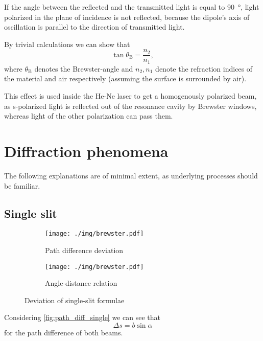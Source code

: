 If the angle between the reflected and the transmitted light is equal to \SI{90}{\degree}, light polarized in the plane of incidence is not reflected, because the dipole's axis of oscillation is parallel to the direction of transmitted light.

By trivial calculations we can show that
\begin{equation}\label{eq:brewster}
	\tan\theta_\text{B}=\frac{n_2}{n_1},
\end{equation}
where $\theta_\text{B}$ denotes the Brewster-angle and $n_2, n_1$ denote the refraction indices of the material and air respectively (assuming the surface is surrounded by air).

This effect is used inside the He-Ne laser to get a homogenously polarized beam, as s-polarized light is reflected out of the resonance cavity by Brewster windows, whereas light of the other polarization can pass them.

\section{Diffraction phenomena}
The following explanations are of minimal extent, as underlying processes should be familiar.

\subsection{Single slit}\label{subsec:single_slit}

\begin{figure}[tb]
	\begin{subfigure}{.51\textwidth}
		\centering
		\texttt{[image: ./img/brewster.pdf]}
		\caption[Single slit I]{Path difference deviation}
		\label{fig:path_diff_single}
	\end{subfigure}
	\begin{subfigure}{.51\textwidth}
		\centering
		\texttt{[image: ./img/brewster.pdf]}
		\caption[Single slit II]{Angle-distance relation}
		\label{fig:angle_distance_single}
	\end{subfigure}
	\caption[Deviation of single-slit formulae]{Deviation of single-slit formulae}
\end{figure}

Considering \autoref{fig:path_diff_single} we can see that	%
\begin{equation*}
	\Delta s=b\sin\alpha
\end{equation*}
for the path difference of both beams.


